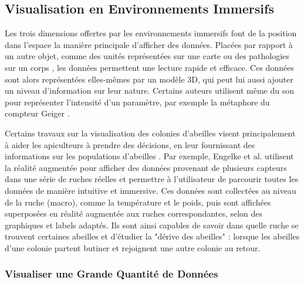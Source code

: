 	\subsection{Visualisation en Environnements Immersifs}
	
	Les trois dimensions offertes par les environnements immersifs font de la position dans l'espace la manière principale d'afficher des données. Placées par rapport à un autre objet, comme des unités représentées sur une carte \cite{durbin_battlefield_1998} ou des pathologies sur un corps \cite{coffey_interactive_2012}, les données permettent une lecture rapide et efficace. Ces données sont alors représentées elles-mêmes par un modèle 3D, qui peut lui aussi ajouter un niveau d'information sur leur nature. Certains auteurs utilisent même du son pour représenter l'intensité d'un paramètre, par exemple la métaphore du compteur Geiger \cite{frohlich_exploring_1999}.
	
	
		
		Certains travaux sur la visualisation des colonies d'abeilles visent principalement à aider les apiculteurs à prendre des décisions, en leur fournissant des informations sur les populations d'abeilles \cite{engelke_visual_2016, engelke_melissar_2016, nguyen_augmented_2017}. Par exemple, Engelke et al. \cite{engelke_visual_2016} utilisent la réalité augmentée pour afficher des données provenant de plusieurs capteurs dans une série de ruches réelles et permettre à l'utilisateur de parcourir toutes les données de manière intuitive et immersive. Ces données sont collectées au niveau de la ruche (macro), comme la température et le poids, puis sont affichées superposées en réalité augmentée aux ruches correspondantes, selon des graphiques et labels adaptés. Ils sont ainsi capables de savoir dans quelle ruche se trouvent certaines abeilles et d'étudier la "dérive des abeilles" : lorsque les abeilles d'une colonie partent butiner et rejoignent une autre colonie au retour.
	
	\subsubsection{Visualiser une Grande Quantité de Données}
	
